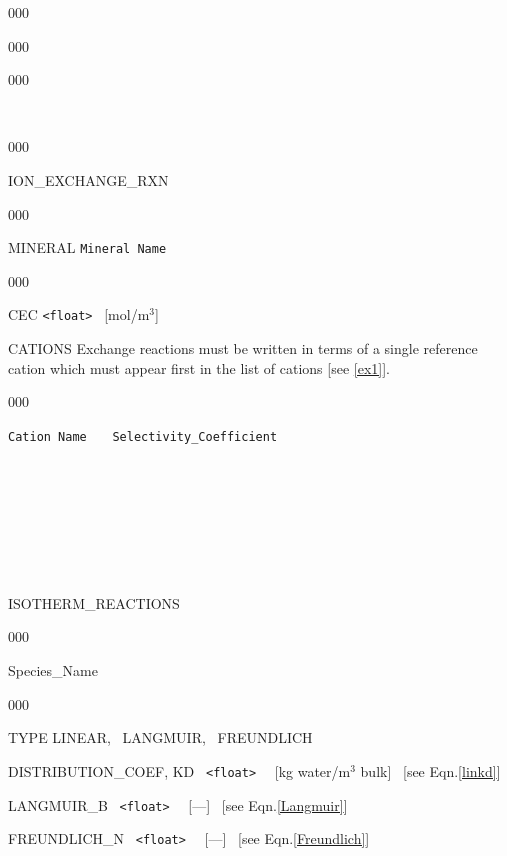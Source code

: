 \begin{deflist}{000}
\begin{deflist}{000}
\begin{deflist}{000}
\item [\keyend]
\end{deflist}
~\\

\begin{deflist}{000}
\item [ION\_EXCHANGE\_RXN] ~
\begin{deflist}{000}
\item [MINERAL] {\tt Mineral Name}
\begin{deflist}{000}
\item [CEC] {\tt <float>} \ [mol/m$^3$]
\item[CATIONS] Exchange reactions must be written in terms of a single reference cation which must appear first in the list of cations [see \eqref{ex1}].
\begin{deflist}{000}
\item[\tt Cation Name]  \ \ \ {\tt Selectivity\_Coefficient}
\end{deflist}
\item [\keyend] ~
\end{deflist}
\item [\keyend] ~
\end{deflist}
\item [\keyend] ~

~\\

\item [ISOTHERM\_REACTIONS] ~

\begin{deflist}{000}
\item [Species\_Name] ~

\begin{deflist}{000}
\item [TYPE] LINEAR, \ LANGMUIR, \ FREUNDLICH
\item [DISTRIBUTION\_COEF, KD] \ {\tt <float>} \ \ [kg water/m$^3$ bulk] \ [see Eqn.\eqref{linkd}]
\item [LANGMUIR\_B] \ {\tt <float>} \ \ [---] \ [see Eqn.\eqref{Langmuir}]
\item [FREUNDLICH\_N] \ {\tt <float>} \ \ [---] \ [see Eqn.\eqref{Freundlich}]
\end{deflist}
\item [\keyend] ~


\end{deflist}
\end{deflist}
\end{deflist}
\end{deflist}
